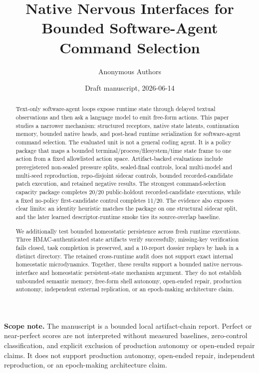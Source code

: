 \documentclass[11pt]{article}
\title{Native Nervous Interfaces for Bounded Software-Agent Command Selection}
\author{Anonymous Authors}
\date{Draft manuscript, 2026-06-14}
\begin{document}
\maketitle

\begin{abstract}
Text-only software-agent loops expose runtime state through delayed textual
observations and then ask a language model to emit free-form actions. This paper
studies a narrower mechanism: structured receptors, native state latents,
continuation memory, bounded native heads, and post-head runtime serialization
for software-agent command selection. The evaluated unit is not a general
coding agent. It is a policy package that maps a bounded
terminal/process/filesystem/time state frame to one action from a fixed
allowlisted action space. Artifact-backed evaluations include preregistered
non-sealed pressure splits, sealed-final controls, local multi-model and
multi-seed reproduction, repo-disjoint sidecar controls, bounded
recorded-candidate patch execution, and retained negative results. The
strongest command-selection capacity package completes 20/20 public-holdout
recorded-candidate executions, while a fixed no-policy first-candidate control
completes 11/20. The evidence also exposes clear limits: an identity heuristic
matches the package on one structural sidecar split, and the later learned
descriptor-runtime smoke ties its source-overlap baseline.

We additionally test bounded homeostatic persistence across fresh runtime
executions. Three HMAC-authenticated state artifacts verify successfully,
missing-key verification fails closed, task completion is preserved, and a
10-report dossier replays by hash in a distinct directory. The retained
cross-runtime audit does not support exact internal homeostatic microdynamics.
Together, these results support a bounded native nervous-interface and
homeostatic persistent-state mechanism argument. They do not establish
unbounded semantic memory, free-form shell autonomy, open-ended repair,
production autonomy, independent external replication, or an epoch-making
architecture claim.
\end{abstract}

\noindent\textbf{Scope note.} The manuscript is a bounded local artifact-chain
report. Perfect or near-perfect scores are not interpreted without measured
baselines, zero-control classification, and explicit exclusion of production
autonomy or open-ended repair claims. It does not support production autonomy,
open-ended repair, independent reproduction, or an epoch-making architecture
claim.
\end{document}
